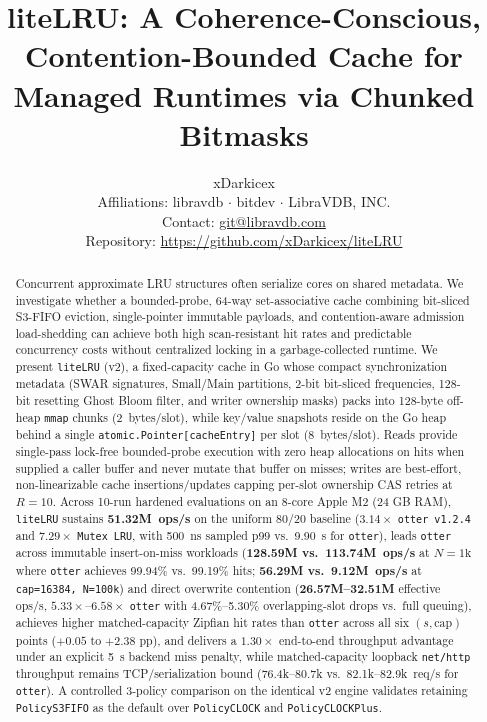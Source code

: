 \documentclass[11pt,a4paper]{article}
\title{\textbf{liteLRU: A Coherence-Conscious, Contention-Bounded Cache for\\
Managed Runtimes via Chunked Bitmasks}}
\author{
  xDarkicex \\
  \small Affiliations: libravdb $\cdot$ bitdev $\cdot$ LibraVDB, INC. \\
  \small Contact: \href{mailto:git@libravdb.com}{git@libravdb.com} \\
  \small Repository: \url{https://github.com/xDarkicex/liteLRU}
}
\date{}
\begin{document}
\maketitle

\begin{abstract}
Concurrent approximate LRU structures often serialize cores on shared metadata. We investigate whether a bounded-probe, 64-way set-associative cache combining bit-sliced S3-FIFO eviction, single-pointer immutable payloads, and contention-aware admission load-shedding can achieve both high scan-resistant hit rates and predictable concurrency costs without centralized locking in a garbage-collected runtime. We present \texttt{liteLRU} (v2), a fixed-capacity cache in Go whose compact synchronization metadata (SWAR signatures, Small/Main partitions, 2-bit bit-sliced frequencies, 128-bit resetting Ghost Bloom filter, and writer ownership masks) packs into 128-byte off-heap \texttt{mmap} chunks (2~bytes/slot), while key/value snapshots reside on the Go heap behind a single \texttt{atomic.Pointer[cacheEntry]} per slot (8~bytes/slot). Reads provide single-pass lock-free bounded-probe execution with zero heap allocations on hits when supplied a caller buffer and never mutate that buffer on misses; writes are best-effort, non-linearizable cache insertions/updates capping per-slot ownership CAS retries at $R=10$. Across 10-run hardened evaluations on an 8-core Apple M2 (24 GB RAM), \texttt{liteLRU} sustains \textbf{51.32M~ops/s} on the uniform 80/20 baseline ($3.14\times$ \texttt{otter v1.2.4} and $7.29\times$ \texttt{Mutex LRU}, with 500~ns sampled p99 vs.\ 9.90~\textmu s for \texttt{otter}), leads \texttt{otter} across immutable insert-on-miss workloads (\textbf{128.59M vs.\ 113.74M~ops/s} at $N=1\text{k}$ where \texttt{otter} achieves 99.94\% vs.\ 99.19\% hits; \textbf{56.29M vs.\ 9.12M~ops/s} at \texttt{cap=16384, N=100k}) and direct overwrite contention (\textbf{26.57M--32.51M} effective ops/s, $5.33\times\text{--}6.58\times$ \texttt{otter} with 4.67\%--5.30\% overlapping-slot drops vs.\ full queuing), achieves higher matched-capacity Zipfian hit rates than \texttt{otter} across all six $(s, \text{cap})$ points ($+0.05$ to $+2.38\text{ pp}$), and delivers a $1.30\times$ end-to-end throughput advantage under an explicit 5~\textmu s backend miss penalty, while matched-capacity loopback \texttt{net/http} throughput remains TCP/serialization bound (76.4k--80.7k vs.\ 82.1k--82.9k~req/s for \texttt{otter}). A controlled 3-policy comparison on the identical v2 engine validates retaining \texttt{PolicyS3FIFO} as the default over \texttt{PolicyCLOCK} and \texttt{PolicyCLOCKPlus}.
\end{abstract}
\end{document}
